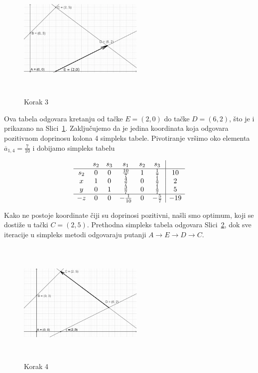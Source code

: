 \documentclass[a4paper, utf8, 11pt, colorlinks]{book}
\theoremstyle{definition}
\begin{document}
\begin{figure}[H]
	\centering
	\includegraphics[width=170pt, height=170pt]{simpleks-primjer-2-sl3.eps}
	\caption{Korak 3}
	\label{fig:step-3}
\end{figure}

Ova tabela odgovara kretanju od tačke $E=(2,0)$ do tačke $D=(6,2)$, što je i prikazano na Slici~\ref{fig:step-3}.
Zaključujemo da je jedina koordinata koja odgovara pozitivnom doprinosu kolona 
4 simpleks tabele. Pivotiranje vršimo oko elementa $\overline{a}_{1,4} = \frac{7}{10}$ i  dobijamo simpleks tabelu 

$$\begin{array}{cccccc| c}
	& s_2  & s_3   & s_1  & s_2 & s_3 &     \\ \hline
s_2 &  0   &  0    & \frac{10}{7}    &  1   & \frac{1}{7}   & 10 \\
x   &  1   &  0    &  \frac{4}{7}    &  0   & \frac{1}{7}  & 2 \\
y   &  0   &  1    &  \frac{3}{7}    &  0   & \frac{1}{7}   & 5  \\ \hline
-z  &  0   &  0   &   -\frac{1}{10}  & 0    &  -\frac{5}{7} & -19 \\
\end{array}
$$ 

Kako ne postoje koordinate čiji su doprinosi pozitivni, našli smo optimum, koji se dostiže u tački $C=(2,5)$. Prethodna simpleks tabela odgovara Slici~\ref{fig:step-4}, dok sve iteracije u simpleks metodi odgovaraju putanji $A \rightarrow E \rightarrow D \rightarrow C$. 

\begin{figure}[H]
	\centering
	\includegraphics[width=170pt, height=170pt]{simpleks-primjer-2-sl4.eps}
	\caption{Korak 4}
	\label{fig:step-4}
\end{figure}
\end{document}
